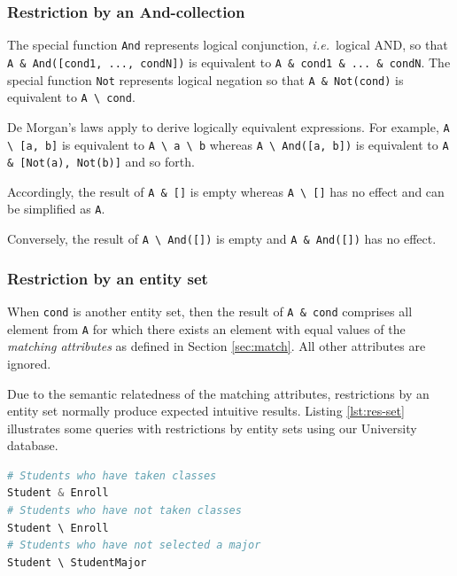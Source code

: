 \documentclass[letter,10pt]{article}
\begin{document}
\subsubsection{Restriction by an And-collection}
The special function \lstinline$And$ represents logical conjunction, \emph{i.e.}\ logical {AND}, so that \lstinline$A & And([cond1, ..., condN])$ is equivalent to \lstinline$A & cond1 & ... & condN$.
The special function \lstinline$Not$ represents logical negation so that \lstinline$A & Not(cond)$ is equivalent to \lstinline$A \ cond$.

De Morgan's laws apply to derive logically equivalent expressions.  
For example, \lstinline$A \ [a, b]$ is equivalent to \lstinline$A \ a \ b$ whereas \lstinline$A \ And([a, b])$ is equivalent to \lstinline$A & [Not(a), Not(b)]$ and so forth.

Accordingly, the result of \lstinline$A & []$ is empty whereas \lstinline$A \ []$ has no effect and can be simplified as \lstinline$A$.

Conversely, the result of \lstinline$A \ And([])$ is empty and \lstinline$A & And([])$ has no effect.

\subsubsection{Restriction by an entity set}
When \lstinline$cond$ is another entity set, then the result of \lstinline$A & cond$ comprises all element from \lstinline$A$ for which there exists an element with equal values of the \emph{matching attributes}  as defined in Section \ref{sec:match}.  
All other attributes are ignored.  

Due to the semantic relatedness of the matching attributes, restrictions by an entity set normally produce expected intuitive results. 
Listing \ref{lst:res-set} illustrates some queries with restrictions by entity sets using our University database.
\begin{lstlisting}[language=Python, caption={Queries with restrictions by entity sets.}, label={lst:res-set}]
# Students who have taken classes
Student & Enroll
# Students who have not taken classes
Student \ Enroll
# Students who have not selected a major
Student \ StudentMajor
\end{lstlisting}
\end{document}
